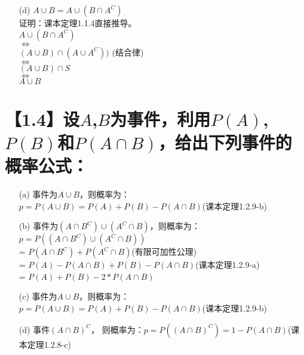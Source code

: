 \documentclass [12pt]{article}
\begin{document}
\begin{CJK*}{GBK}{kai}
\begin{enumerate}
   \item[(d)] $A \cup B = A \cup (B \cap A^{C})$\\
   证明：课本定理1.1.4直接推导。\\
   $ A \cup (B \cap A^{C})$\\
   $\Leftrightarrow$\\
   $(A \cup B) \cap (A \cup A^{C}))$ (结合律)\\
   $\Leftrightarrow$\\
   $(A \cup B) \cap S$\\
   $\Leftrightarrow$\\
   $A \cup B $
\end{enumerate}

\section{【1.4】设$A$,$B$为事件，利用$P(A)$,$P(B)$和$P(A \cap B)$，给出下列事件的概率公式：}
\begin{enumerate}
  \item[(a)]  事件为$A \cup B$，则概率为：$p=P(A \cup B) =  P(A) + P(B) - P(A \cap B) $(课本定理1.2.9-b)
  \item[(b)]  事件为$(A \cap B^{C}) \cup (A^{C} \cap B)$，则概率为：$p=P((A \cap B^{C}) \cup (A^{C} \cap B)) $\\
  = $P(A \cap B^{C}) + P(A^{C} \cap B) $(有限可加性公理)\\
  = $P(A) - P(A \cap B) + P(B) - P(A \cap B)  $(课本定理1.2.9-a)\\
  = $P(A) + P(B) - 2*P(A \cap B) $
  \item[(c)]  事件为$A \cup B$，则概率为：$p=P(A \cup B) =  P(A) + P(B) - P(A \cap B) $(课本定理1.2.9-b)
  \item[(d)]  事件$(A \cap B)^{C}$， 则概率为：$p=P((A \cap B)^{C}) =1 - P(A \cap B)  $(课本定理1.2.8-c)
  
  \end{enumerate}
  

\end{CJK*}
\end{document}
